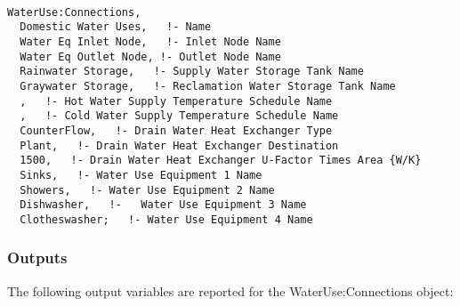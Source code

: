 \begin{lstlisting}

WaterUse:Connections,
  Domestic Water Uses,   !- Name
  Water Eq Inlet Node,   !- Inlet Node Name
  Water Eq Outlet Node, !- Outlet Node Name
  Rainwater Storage,   !- Supply Water Storage Tank Name
  Graywater Storage,   !- Reclamation Water Storage Tank Name
  ,   !- Hot Water Supply Temperature Schedule Name
  ,   !- Cold Water Supply Temperature Schedule Name
  CounterFlow,   !- Drain Water Heat Exchanger Type
  Plant,   !- Drain Water Heat Exchanger Destination
  1500,   !- Drain Water Heat Exchanger U-Factor Times Area {W/K}
  Sinks,   !- Water Use Equipment 1 Name
  Showers,   !- Water Use Equipment 2 Name
  Dishwasher,   !-   Water Use Equipment 3 Name
  Clotheswasher;   !- Water Use Equipment 4 Name
\end{lstlisting}

\subsubsection{Outputs}\label{outputs-1-031}

The following output variables are reported for the WaterUse:Connections object:

